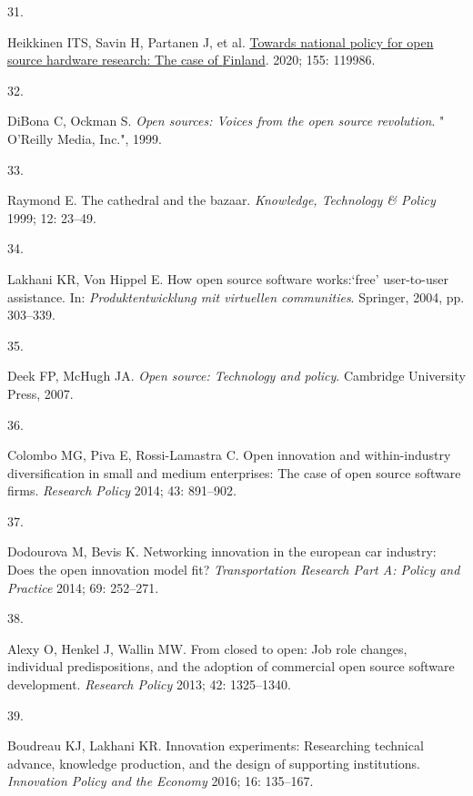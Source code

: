 \documentclass[
  11pt,
  a4paperpaper,
  onecolumn]{article}
\newlength{\cslhangindent}
\newlength{\csllabelwidth}
\newlength{\cslentryspacingunit} %
\newenvironment{CSLReferences}[2] %
 {%
  \setlength{\parindent}{0pt}
  \ifodd #1
  \let\oldpar\par
  \def\par{\hangindent=\cslhangindent\oldpar}
  \fi
  \setlength{\parskip}{#2\cslentryspacingunit}
 }%
 {}
\newcommand{\CSLLeftMargin}[1]{\parbox[t]{\csllabelwidth}{#1}}
\newcommand{\CSLRightInline}[1]{\parbox[t]{\linewidth - \csllabelwidth}{#1}\break}
\begin{document}
\begin{CSLReferences}{0}{0}
\leavevmode{}%
\CSLLeftMargin{31. }%
\CSLRightInline{Heikkinen ITS, Savin H, Partanen J, et al.
\href{https://doi.org/10.1016/j.techfore.2020.119986}{Towards national
policy for open source hardware research: {The} case of {Finland}}.
2020; 155: 119986.}

\leavevmode{}%
\CSLLeftMargin{32. }%
\CSLRightInline{DiBona C, Ockman S. \emph{Open sources: Voices from the
open source revolution}. " O'Reilly Media, Inc.", 1999.}

\leavevmode{}%
\CSLLeftMargin{33. }%
\CSLRightInline{Raymond E. The cathedral and the bazaar.
\emph{Knowledge, Technology \& Policy} 1999; 12: 23--49.}

\leavevmode{}%
\CSLLeftMargin{34. }%
\CSLRightInline{Lakhani KR, Von Hippel E. How open source software
works:{`free'} user-to-user assistance. In: \emph{Produktentwicklung mit
virtuellen communities}. Springer, 2004, pp. 303--339.}

\leavevmode{}%
\CSLLeftMargin{35. }%
\CSLRightInline{Deek FP, McHugh JA. \emph{Open source: Technology and
policy}. Cambridge University Press, 2007.}

\leavevmode{}%
\CSLLeftMargin{36. }%
\CSLRightInline{Colombo MG, Piva E, Rossi-Lamastra C. Open innovation
and within-industry diversification in small and medium enterprises: The
case of open source software firms. \emph{Research Policy} 2014; 43:
891--902.}

\leavevmode{}%
\CSLLeftMargin{37. }%
\CSLRightInline{Dodourova M, Bevis K. Networking innovation in the
european car industry: Does the open innovation model fit?
\emph{Transportation Research Part A: Policy and Practice} 2014; 69:
252--271.}

\leavevmode{}%
\CSLLeftMargin{38. }%
\CSLRightInline{Alexy O, Henkel J, Wallin MW. From closed to open: Job
role changes, individual predispositions, and the adoption of commercial
open source software development. \emph{Research Policy} 2013; 42:
1325--1340.}

\leavevmode{}%
\CSLLeftMargin{39. }%
\CSLRightInline{Boudreau KJ, Lakhani KR. Innovation experiments:
Researching technical advance, knowledge production, and the design of
supporting institutions. \emph{Innovation Policy and the Economy} 2016;
16: 135--167.}


\end{CSLReferences}
\end{document}
